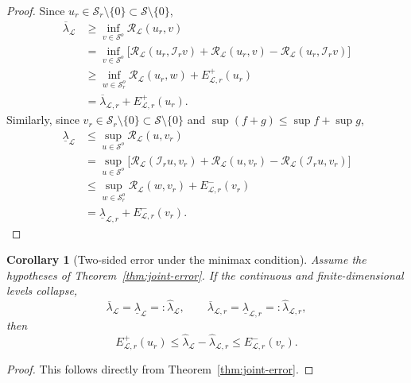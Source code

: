\documentclass[preprint,10pt]{elsarticle}
\theoremstyle{plain}
\newtheorem{corollary}{Corollary}
\theoremstyle{definition}
\theoremstyle{remark}
\begin{document}
\begin{proof}
	Since \(u_r\in\mathcal S_r\setminus\{0\}\subset\mathcal S\setminus\{0\}\),
	\[
	\begin{aligned}
		\overline\lambda_{\mathcal L}
		&\ge
		\inf_{v\in\mathcal S^o}
		\mathcal R_{\mathcal L}(u_r,v)
		\\
		&=
		\inf_{v\in\mathcal S^o}
		\bigl[
		\mathcal R_{\mathcal L}(u_r,\mathcal I_r v)
		+
		\mathcal R_{\mathcal L}(u_r,v)
		-
		\mathcal R_{\mathcal L}(u_r,\mathcal I_r v)
		\bigr]
		\\
		&\ge
		\inf_{w\in\mathcal S_r^o}
		\mathcal R_{\mathcal L}(u_r,w)
		+
		E^+_{\mathcal L,r}(u_r)
		\\
		&=
		\overline\lambda_{\mathcal L,r}
		+
		E^+_{\mathcal L,r}(u_r).
	\end{aligned}
	\]
	Similarly, since
	\(v_r\in\mathcal S_r\setminus\{0\}\subset\mathcal S\setminus\{0\}\) and
	\(\sup(f+g)\le \sup f+\sup g\),
	\[
	\begin{aligned}
		\underline\lambda_{\mathcal L}
		&\le
		\sup_{u\in\mathcal S^o}
		\mathcal R_{\mathcal L}(u,v_r)
		\\
		&=
		\sup_{u\in\mathcal S^o}
		\bigl[
		\mathcal R_{\mathcal L}(\mathcal I_r u,v_r)
		+
		\mathcal R_{\mathcal L}(u,v_r)
		-
		\mathcal R_{\mathcal L}(\mathcal I_r u,v_r)
		\bigr]
		\\
		&\le
		\sup_{w\in\mathcal S_r^o}
		\mathcal R_{\mathcal L}(w,v_r)
		+
		E^-_{\mathcal L,r}(v_r)
		\\
		&=
		\underline\lambda_{\mathcal L,r}
		+
		E^-_{\mathcal L,r}(v_r).
	\end{aligned}
	\]
\end{proof}

\begin{corollary}[Two-sided error under the minimax condition]
	\label{cor:two-sided-error-short}
	Assume the hypotheses of Theorem~\ref{thm:joint-error}. If the continuous
	and finite-dimensional levels collapse,
	\[
	\overline\lambda_{\mathcal L}
	=
	\underline\lambda_{\mathcal L}
	=:
	\hat\lambda_{\mathcal L},
	\qquad
	\overline\lambda_{\mathcal L,r}
	=
	\underline\lambda_{\mathcal L,r}
	=:
	\hat\lambda_{\mathcal L,r},
	\]
	then
	\begin{equation}\label{eq:two-sided-error-short}
		E^+_{\mathcal L,r}(u_r)
		\le
		\hat\lambda_{\mathcal L}
		-
		\hat\lambda_{\mathcal L,r}
		\le
		E^-_{\mathcal L,r}(v_r).
	\end{equation}
\end{corollary}

\begin{proof}
	This follows directly from Theorem~\ref{thm:joint-error}.
\end{proof}
\end{document}
